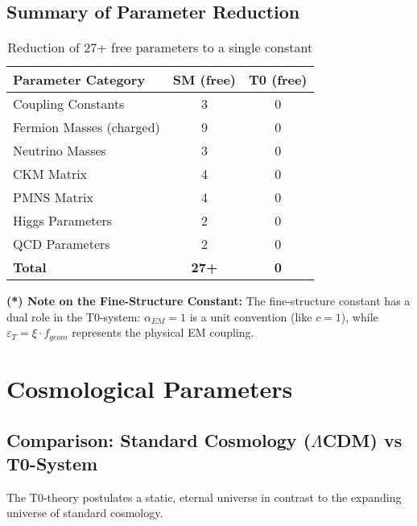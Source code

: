 \documentclass[12pt,a4paper]{article}
\begin{document}
	\subsection{Summary of Parameter Reduction}
	
	\begin{table}[H]
		\centering
		\begin{tabular}{lcc}
			\toprule
			\textbf{Parameter Category} & \textbf{SM (free)} & \textbf{T0 (free)} \\
			\midrule
			Coupling Constants & 3 & 0 \\
			Fermion Masses (charged) & 9 & 0 \\
			Neutrino Masses & 3 & 0 \\
			CKM Matrix & 4 & 0 \\
			PMNS Matrix & 4 & 0 \\
			Higgs Parameters & 2 & 0 \\
			QCD Parameters & 2 & 0 \\
			\midrule
			\textbf{Total} & \textbf{27+} & \textbf{0} \\
			\bottomrule
		\end{tabular}
		\caption{Reduction of 27+ free parameters to a single constant}
	\end{table}
	
	\textbf{(*) Note on the Fine-Structure Constant:}
	The fine-structure constant has a dual role in the T0-system: $\alpha_{EM} = 1$ is a unit convention (like $c = 1$), while $\varepsilon_T = \xi \cdot f_{geom}$ represents the physical EM coupling.
	
	\section{Cosmological Parameters}
	
	\subsection{Comparison: Standard Cosmology ($\Lambda$CDM) vs T0-System}
	
	The T0-theory postulates a static, eternal universe in contrast to the expanding universe of standard cosmology.
	
\end{document}
